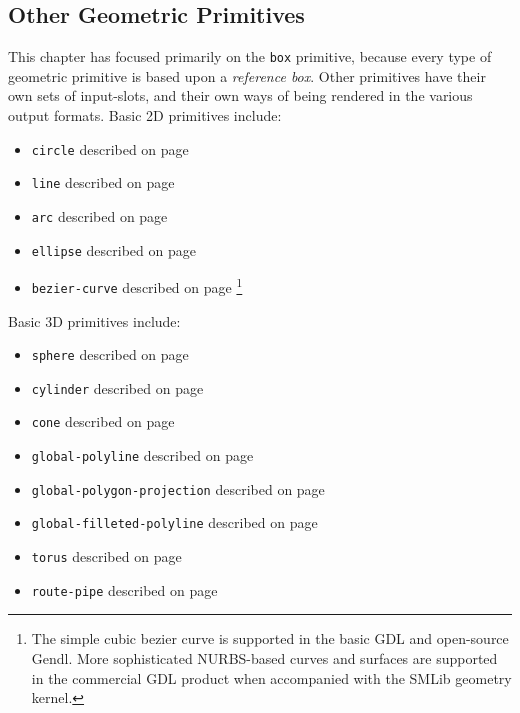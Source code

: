 \documentclass [11pt]{book}
\begin{document}
\subsection{Other Geometric Primitives}

\label{subsec:othergeometricprimitives}

This chapter has focused primarily on the \texttt{box} primitive, because every type of geometric primitive is based upon a \emph{reference box}. Other primitives have their own sets of input-slots, and their
     own ways of being rendered in the various output formats. Basic
     2D primitives include:

\begin{itemize}

\item \texttt{circle} described on page 
\pageref{prim:circle}

\item \texttt{line} described on page 
\pageref{prim:line}

\item \texttt{arc} described on page 
\pageref{prim:arc}

\item \texttt{ellipse} described on page 
\pageref{prim:ellipse}

\item \texttt{bezier-curve} described on page 
\pageref{prim:bezier-curve}\footnote{The simple cubic bezier curve is supported
	       in the basic GDL and open-source Gendl. More
	       sophisticated NURBS-based curves and surfaces are
	       supported in the commercial GDL product when
	       accompanied with the SMLib geometry kernel.}

\end{itemize}

Basic 3D primitives include:

\begin{itemize}

\item \texttt{sphere} described on page 
\pageref{prim:sphere}

\item \texttt{cylinder} described on page 
\pageref{prim:cylinder}

\item \texttt{cone} described on page 
\pageref{prim:cone}

\item \texttt{global-polyline} described on page 
\pageref{prim:global-polyline}

\item \texttt{global-polygon-projection} described on page 
\pageref{prim:global-polygon-projection}

\item \texttt{global-filleted-polyline} described on page 
\pageref{prim:global-polyline}

\item \texttt{torus} described on page 
\pageref{prim:torus}

\item \texttt{route-pipe} described on page 
\pageref{prim:route-pipe}

\end{itemize}
\end{document}

